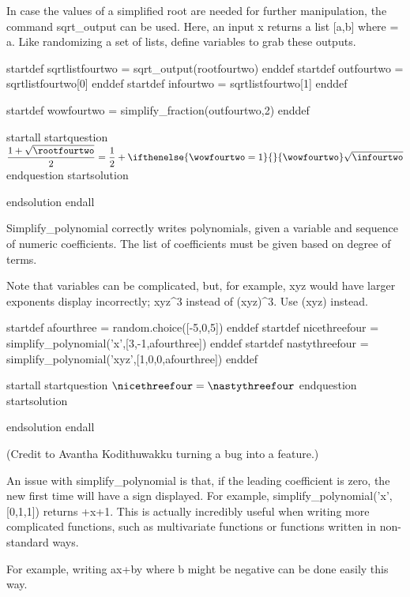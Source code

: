 
In case the values of a simplified root are needed for further manipulation, the command sqrt_output can be used. Here, an input x returns a list [a,b] where  = a. Like randomizing a set of lists, define variables to grab these outputs.

startdef sqrtlistfourtwo = sqrt_output(rootfourtwo) enddef
startdef outfourtwo = sqrtlistfourtwo[0] enddef
startdef infourtwo = sqrtlistfourtwo[1] enddef

startdef wowfourtwo = simplify_fraction(outfourtwo,2) enddef

startall
startquestion $\dfrac{1+\sqrt{\rootfourtwo}}{2} = \dfrac{1}{2} + \ifthenelse{\wowfourtwo = 1}{}{\wowfourtwo} \sqrt{\infourtwo}$
endquestion
startsolution \item endsolution
endall




Simplify_polynomial correctly writes polynomials, given a variable and sequence of numeric coefficients. The list of coefficients must be given based on degree of terms. 

Note that variables can be complicated, but, for example, xyz would have larger exponents display incorrectly; xyz^3 instead of (xyz)^3. Use (xyz) instead.

startdef afourthree = random.choice([-5,0,5]) enddef
startdef nicethreefour = simplify_polynomial('x',[3,-1,afourthree]) enddef
startdef nastythreefour = simplify_polynomial('xyz',[1,0,0,afourthree]) enddef

startall
startquestion  $\nicethreefour = \nastythreefour$ endquestion
startsolution \item  endsolution
endall




(Credit to Avantha Kodithuwakku turning a bug into a feature.)

An issue with simplify_polynomial is that, if the leading coefficient is zero, the new first time will have a sign displayed. For example, simplify_polynomial('x',[0,1,1]) returns +x+1. This is actually incredibly useful when writing more complicated functions, such as multivariate functions or functions written in non-standard ways.

For example, writing ax+by where b might be negative can be done easily this way.

